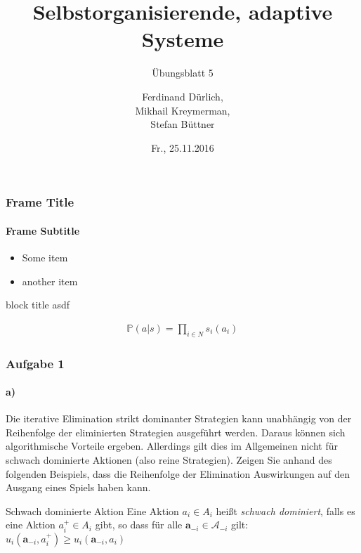 \documentclass{beamer}
\title[SOAS]{Selbstorganisierende, adaptive Systeme}
\subtitle{Übungsblatt 5}
\author[Ferdinand, Mikhail, Stefan]{ %
Ferdinand Dürlich, \\
Mikhail Kreymerman, \\
Stefan Büttner
}
\institute[ISSE]{ %
Institut for Software \& Systems Engineering\\
Universität Augsburg
}
\date{Fr., 25.11.2016}
\begin{document}
\frame{\titlepage}

\begin{frame}
\frametitle{Frame Title}
\framesubtitle{Frame Subtitle}

\begin{itemize}
    \item Some item
    \item another item
\end{itemize}

\begin{block}{block title}
    asdf
\end{block}
\begin{align*}
    \mathbb{P}(a|s) = \prod_{i \in N} s_i(a_i)
\end{align*}
\end{frame}

\begin{frame}
	\frametitle{Aufgabe 1}
	\framesubtitle{a)}
	Die iterative Elimination strikt dominanter Strategien kann unabhängig von der Reihenfolge
	der eliminierten Strategien ausgeführt werden. Daraus können sich algorithmische Vorteile
	ergeben. Allerdings gilt dies im Allgemeinen nicht für schwach dominierte Aktionen (also reine Strategien). Zeigen Sie anhand des folgenden Beispiels, dass die Reihenfolge der Elimination Auswirkungen auf den Ausgang eines Spiels haben kann.
	
	\begin{block}{Schwach dominierte Aktion}
		Eine Aktion $a_i \in A_i$ heißt \textit{schwach dominiert}, falls es eine Aktion $a^+_i \in A_i$ gibt, so dass für
		alle $\mathbf{a}_{-i} \in \mathcal{A}_{-i}$ gilt:\\
		\centering
		$u_i(\mathbf{a}_{-i}, a^+_i) \ge u_i(\mathbf{a}_{-i}, a_i)$
	\end{block}
\end{frame}	
\end{document}
